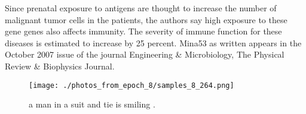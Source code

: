 \documentclass{article}%
\begin{document}
Since prenatal exposure to antigens are thought to increase the number of malignant tumor cells in the patients, the authors say high exposure to these gene genes also affects immunity. The severity of immune function for these diseases is estimated to increase by 25 percent.\newline%
Mina53 as written appears in the October 2007 issue of the journal Engineering \& Microbiology, The Physical Review \& Biophysics Journal.\newline%

%


\begin{figure}[h!]%
\centering%
\texttt{[image: ./photos\_from\_epoch\_8/samples\_8\_264.png]}%
\caption{a man in a suit and tie is smiling .}%
\end{figure}

%
\end{document}
